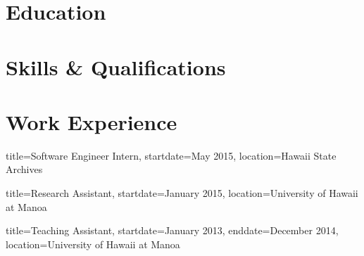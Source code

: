 \documentclass{resume}
\begin{document}

\makeheader

\section{Education}
\section{Skills \& Qualifications}
\section{Work Experience}

\begin{job}{title=Software Engineer Intern,
            startdate=May 2015,
            location=Hawaii State Archives}
\end{job}

\begin{job}{title=Research Assistant,
            startdate=January 2015,
            location=University of Hawaii at Manoa}
\end{job}

\begin{job}{title=Teaching Assistant,
            startdate=January 2013,
            enddate=December 2014,
            location=University of Hawaii at Manoa}
\end{job}
\end{document}
